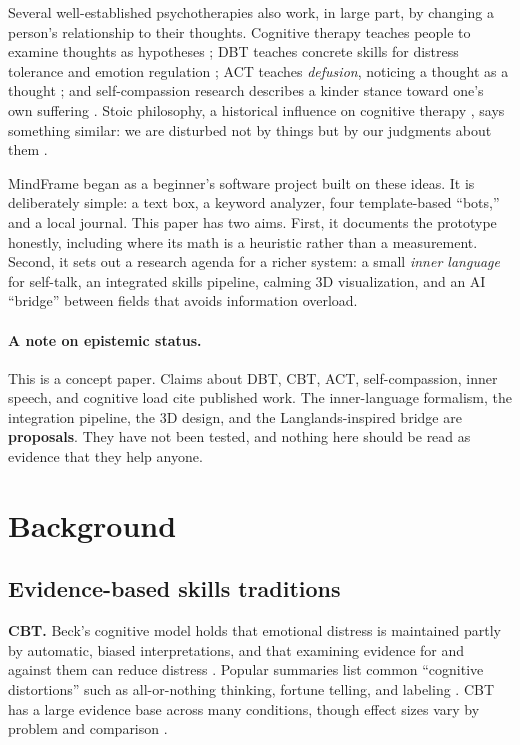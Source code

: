 \documentclass[11pt]{article}
\begin{document}
Several well-established psychotherapies also work, in large part, by changing a person's relationship to their thoughts. Cognitive therapy teaches people to examine thoughts as hypotheses \citep{beck1979}; DBT teaches concrete skills for distress tolerance and emotion regulation \citep{linehan2015}; ACT teaches \emph{defusion}, noticing a thought as a thought \citep{hayes2012}; and self-compassion research describes a kinder stance toward one's own suffering \citep{neff2003}. Stoic philosophy, a historical influence on cognitive therapy \citep{robertson2010}, says something similar: we are disturbed not by things but by our judgments about them \citep{epictetus}.

MindFrame began as a beginner's software project built on these ideas. It is deliberately simple: a text box, a keyword analyzer, four template-based ``bots,'' and a local journal. This paper has two aims. First, it documents the prototype honestly, including where its math is a heuristic rather than a measurement. Second, it sets out a research agenda for a richer system: a small \emph{inner language} for self-talk, an integrated skills pipeline, calming 3D visualization, and an AI ``bridge'' between fields that avoids information overload.

\paragraph{A note on epistemic status.} This is a concept paper. Claims about DBT, CBT, ACT, self-compassion, inner speech, and cognitive load cite published work. The inner-language formalism, the integration pipeline, the 3D design, and the Langlands-inspired bridge are \textbf{proposals}. They have not been tested, and nothing here should be read as evidence that they help anyone.

\section{Background}
\subsection{Evidence-based skills traditions}
\textbf{CBT.} Beck's cognitive model holds that emotional distress is maintained partly by automatic, biased interpretations, and that examining evidence for and against them can reduce distress \citep{beck1976,beck1979}. Popular summaries list common ``cognitive distortions'' such as all-or-nothing thinking, fortune telling, and labeling \citep{burns1980}. CBT has a large evidence base across many conditions, though effect sizes vary by problem and comparison \citep{hofmann2012}.
\end{document}
